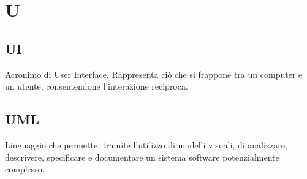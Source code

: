 \section*{U}
\markright{}
\subsection*{UI}
Acronimo di User Interface. Rappresenta ciò che si frappone tra un computer e un utente, consentendone l'interazione reciproca.

\subsection*{UML}
Linguaggio che permette, tramite l'utilizzo di modelli visuali, di analizzare, descrivere, specificare e documentare un sistema software potenzialmente complesso.
